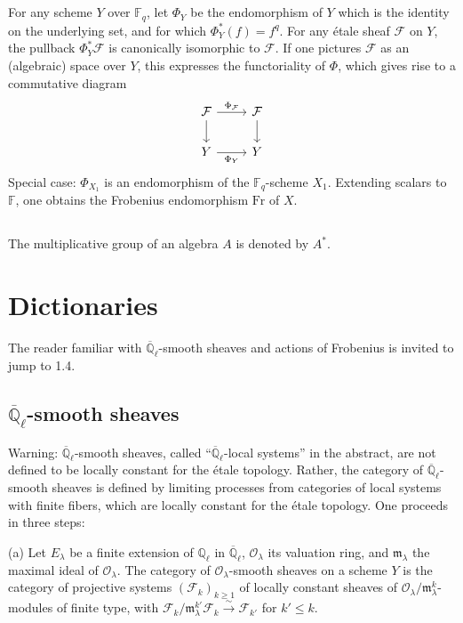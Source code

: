 \documentclass[11pt,a4paper]{article}
\theoremstyle{plain}
\theoremstyle{definition}
\newcommand{\Ql}{\overline{\mathbb{Q}}_\ell}
\newcommand{\Fq}{\mathbb{F}_q}
\newcommand{\F}{\mathbb{F}}
\newcommand{\Q}{\mathbb{Q}}
\newcommand{\Fr}{\mathrm{Fr}}
\begin{document}
\subsection{}
For any scheme $Y$ over $\Fq$, let $\Phi_Y$ be the endomorphism of $Y$ which is the identity on the underlying set, and for which $\Phi_Y^*(f) = f^q$. For any \'etale sheaf $\mathcal{F}$ on $Y$, the pullback $\Phi_Y^* \mathcal{F}$ is canonically isomorphic to $\mathcal{F}$. If one pictures $\mathcal{F}$ as an (algebraic) space over $Y$, this expresses the functoriality of $\Phi$, which gives rise to a commutative diagram
\begin{equation}
\begin{tikzcd}
\mathcal{F} \arrow[r, "\Phi_{\mathcal{F}}"] \arrow[d] & \mathcal{F} \arrow[d] \\
Y \arrow[r, "\Phi_Y"'] & Y
\end{tikzcd}
\end{equation}
Special case: $\Phi_{X_1}$ is an endomorphism of the $\Fq$-scheme $X_1$. Extending scalars to $\F$, one obtains the Frobenius endomorphism $\Fr$ of $X$.

\subsection{}
The multiplicative group of an algebra $A$ is denoted by $A^*$.

\section{Dictionaries}

The reader familiar with $\Ql$-smooth sheaves and actions of Frobenius is invited to jump to 1.4.

\subsection{$\Ql$-smooth sheaves}

Warning: $\Ql$-smooth sheaves, called ``$\Ql$-local systems'' in the abstract, are not defined to be locally constant for the \'etale topology. Rather, the category of $\Ql$-smooth sheaves is defined by limiting processes from categories of local systems with finite fibers, which are locally constant for the \'etale topology. One proceeds in three steps:

(a) Let $E_\lambda$ be a finite extension of $\Q_\ell$ in $\Ql$, $\mathcal{O}_\lambda$ its valuation ring, and $\mathfrak{m}_\lambda$ the maximal ideal of $\mathcal{O}_\lambda$. The category of $\mathcal{O}_\lambda$-smooth sheaves on a scheme $Y$ is the category of projective systems $(\mathcal{F}_k)_{k \geq 1}$ of locally constant sheaves of $\mathcal{O}_\lambda/\mathfrak{m}_\lambda^k$-modules of finite type, with $\mathcal{F}_k/\mathfrak{m}_\lambda^{k'} \mathcal{F}_k \xrightarrow{\sim} \mathcal{F}_{k'}$ for $k' \leq k$.
\end{document}
